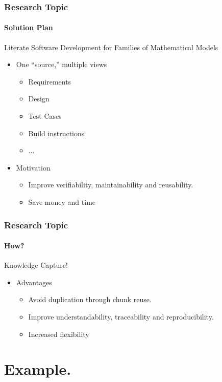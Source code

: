 \documentclass{beamer}
\begin{document}

\begin{frame}

\frametitle{Research Topic}
\framesubtitle{Solution Plan}

Literate Software Development for Families of Mathematical Models

\begin{itemize}
\item One ``source,'' multiple views
\begin{itemize}
\item Requirements%
\item Design
\item Test Cases
\item Build instructions
\item ...
\end{itemize}
\item Motivation
\begin{itemize}
\item Improve verifiability, maintainability and reusability.
\item Save money and time%
\end{itemize}
\end{itemize}
\end{frame}


\begin{frame}

\frametitle{Research Topic}
\framesubtitle{How?}

Knowledge Capture!

\begin{itemize}
\item Advantages
\begin{itemize}
\item Avoid duplication through chunk reuse.
\item Improve understandability, traceability and reproducibility.
\item Increased flexibility
\end{itemize}
\end{itemize}
\end{frame}


\section[Example]{Example.}
\end{document}

